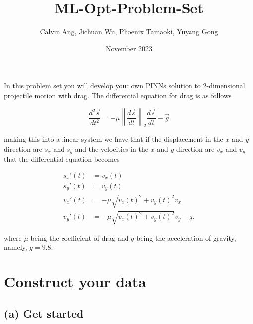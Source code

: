 \documentclass{article}
\title{ML-Opt-Problem-Set}
\author{Calvin Ang, Jichuan Wu, Phoenix Tamaoki, Yuyang Gong}
\date{November 2023}
\begin{document}
\maketitle

\maketitle

In this problem set you will develop your own PINNs solution to $2$-dimensional projectile motion with drag. The differential equation for drag is as follows

$$\frac{d^2 \Vec{s}}{dt^2} = - \mu \left \lVert \frac{d \Vec{s}}{dt} \right\rVert_2 \frac{d \Vec{s}}{dt} - \Vec{g}$$

making this into a linear system we have that if the displacement in the $x$ and $y$ direction are $s_x$ and $s_y$ and the velocities in the $x$ and $y$ direction are $v_x$ and $v_y$ that the differential equation becomes

\begin{align}
    s_x'(t) &= v_x(t)\\
    s_y'(t) &= v_y(t)\\
    v_x'(t) &= -\mu \sqrt{v_x(t)^2 + v_y(t)^2} v_x\\
    v_y'(t) &= -\mu \sqrt{v_x(t)^2 + v_y(t)^2} v_y - g.
\end{align}

where $\mu$ being the coefficient of drag and $g$ being the acceleration of gravity, namely, $g = 9.8$.

\section{Construct your data}

\subsection{(a) Get started}
\end{document}
